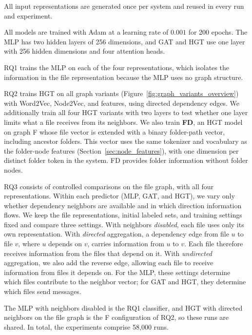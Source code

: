 All input representations are generated once per system and reused in every run and experiment.

All models are trained with Adam at a learning rate of $0.001$ for 200 epochs. The MLP has two hidden layers of 256 dimensions, and GAT and HGT use one layer with 256 hidden dimensions and four attention heads.

RQ1 trains the MLP on each of the four representations, which isolates the information in the file representation because the MLP uses no graph structure.

RQ2 trains HGT on all graph variants (Figure~\ref{fig:graph_variants_overview}) with Word2Vec, Node2Vec, and \ft{} features, using directed dependency edges. We additionally train all four HGT variants with two layers to test whether one layer limits what a file receives from its neighbors. We also train \textbf{FD}, an HGT model on graph F whose \ft{} file vector is extended with a binary folder-path vector, including ancestor folders. This vector uses the same tokenizer and vocabulary as the folder-node features (Section~\ref{sec:node_features}), with one dimension per distinct folder token in the system. FD provides folder information without folder nodes.

RQ3 consists of controlled comparisons on the file graph, with all four representations. Within each predictor (MLP, GAT, and HGT), we vary only whether dependency neighbors are available and in which direction information flows. We keep the file representations, initial labeled sets, and training settings fixed and compare three settings. With neighbors \emph{disabled}, each file uses only its own representation. With \emph{directed} aggregation, a dependency edge from file $u$ to file $v$, where $u$ depends on $v$, carries information from $u$ to $v$. Each file therefore receives information from the files that depend on it. With \emph{undirected} aggregation, we also add the reverse edge, allowing each file to receive information from files it depends on. For the MLP, these settings determine which files contribute to the neighbor vector; for GAT and HGT, they determine which files send messages.

The MLP with neighbors disabled is the RQ1 classifier, and HGT with directed neighbors on the file graph is the F configuration of RQ2, so these runs are shared. In total, the experiments comprise 58,000 runs.


